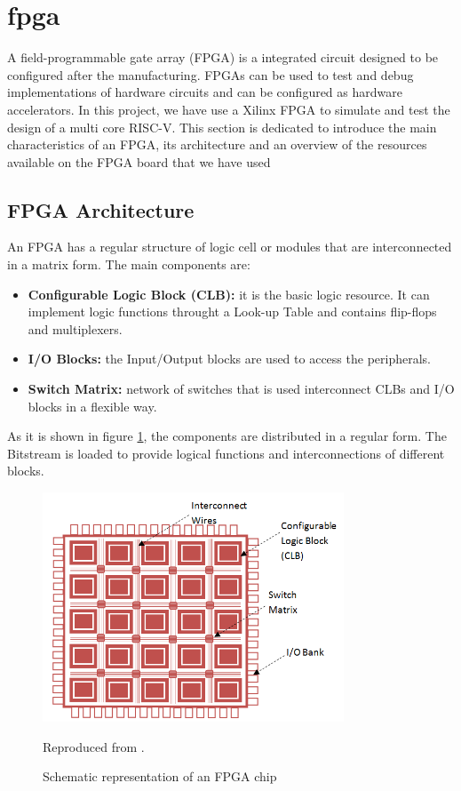 \section{\gls{fpga}}

A field-programmable gate array (FPGA) is a integrated circuit designed to be configured after the manufacturing. FPGAs can be used to test and debug implementations of hardware circuits and can be configured as hardware accelerators. In this project, we have use a Xilinx FPGA to simulate and test the design of a multi core RISC-V. This section is dedicated to introduce the main characteristics of an FPGA, its architecture and an overview of the resources available on the FPGA board that we have used

\subsection{FPGA Architecture}
An FPGA has a regular structure of logic cell or modules that are interconnected in a matrix form. The main components are:

\begin{itemize}
	\item \textbf{Configurable Logic Block (CLB):} it is the basic logic resource. It can implement logic functions throught a Look-up Table and contains flip-flops and multiplexers. 
	\item \textbf{I/O Blocks:} the Input/Output blocks are used to access the peripherals. 
	\item \textbf{Switch Matrix:} network of switches that is used interconnect CLBs and I/O blocks in a flexible way.
\end{itemize}

As it is shown in figure \ref{fig:fpga}, the components are distributed in a regular  form. The Bitstream is loaded to provide logical functions and interconnections of different blocks. 

\begin{figure}[h]
    \centering
    \includegraphics[width=0.8\textwidth]{../presentation/images/FPGA-Architecture.png}
    \caption{Schematic representation of an FPGA chip} Reproduced from \cite{FPGA}.
    \label{fig:fpga}
\end{figure}

